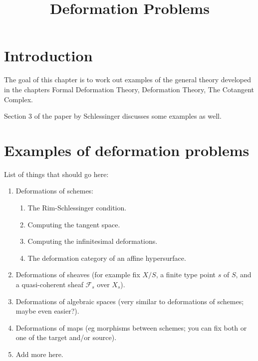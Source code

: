 \documentclass{stacks-project}
\theoremstyle{plain}
\theoremstyle{definition}
\theoremstyle{remark}
\numberwithin{equation}{subsection}
\begin{document}
\title{Deformation Problems}

\maketitle

\label{section-phantom}

\tableofcontents

\section{Introduction}
\label{section-introduction}

\noindent
The goal of this chapter is to work out examples of the general theory
developed in the chapters Formal Deformation Theory,
Deformation Theory, The Cotangent Complex.

\medskip\noindent
Section 3 of the paper \cite{Sch} by Schlessinger discusses some
examples as well.






\section{Examples of deformation problems}
\label{section-examples}

\noindent
List of things that should go here:
\begin{enumerate}
\item Deformations of schemes:
\begin{enumerate}
\item The Rim-Schlessinger condition.
\item Computing the tangent space.
\item Computing the infinitesimal deformations.
\item The deformation category of an affine hypersurface.
\end{enumerate}
\item Deformations of sheaves (for example fix $X/S$, a finite type point
$s$ of $S$, and a quasi-coherent sheaf $\mathcal{F}_s$ over $X_s$).
\item Deformations of algebraic spaces (very similar to deformations
of schemes; maybe even easier?).
\item Deformations of maps (eg morphisms between schemes; you can fix
both or one of the target and/or source).
\item Add more here.
\end{enumerate}
\end{document}
